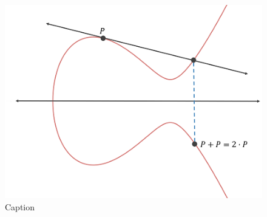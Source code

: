 \documentclass{article}
\begin{document}
    \begin{figure}
        \centering
        \includegraphics{sp23/hw-supplements/hw7-supp-scuffed/point_scalar_multiplication.png}
        \caption{Caption}
        \label{fig:my_label}
    \end{figure}
\end{document}
